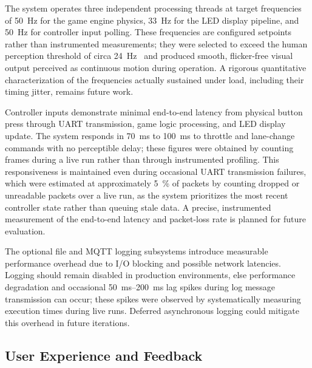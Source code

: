 \documentclass[10pt,journal,final,a4paper]{IEEEtran}
\begin{document}
The system operates three independent processing threads at target frequencies of \SI{50}{\hertz} for the game engine physics, \SI{33}{\hertz} for the LED display pipeline, and \SI{50}{\hertz} for controller input polling. These frequencies are configured setpoints rather than instrumented measurements; they were selected to exceed the human perception threshold of circa \SI{24}{\hertz}~\cite{chen:2007review,pazhoohi:2021effect} and produced smooth, flicker-free visual output perceived as continuous motion during operation. A rigorous quantitative characterization of the frequencies actually sustained under load, including their timing jitter, remains future work.

Controller inputs demonstrate minimal end-to-end latency from physical button press through UART transmission, game logic processing, and LED display update. The system responds in \SI{70}{\milli\second} to \SI{100}{\milli\second} to throttle and lane-change commands with no perceptible delay; these figures were obtained by counting frames during a live run rather than through instrumented profiling. This responsiveness is maintained even during occasional UART transmission failures, which were estimated at approximately \SI{5}{\percent} of packets by counting dropped or unreadable packets over a live run, as the system prioritizes the most recent controller state rather than queuing stale data. A precise, instrumented measurement of the end-to-end latency and packet-loss rate is planned for future evaluation.

The optional file and MQTT logging subsystems introduce measurable performance overhead due to I/O blocking and possible network latencies. Logging should remain disabled in production environments, else performance degradation and occasional \SI{50}{\milli\second}--\SI{200}{\milli\second} lag spikes during log message transmission can occur; these spikes were observed by systematically measuring execution times during live runs. Deferred asynchronous logging could mitigate this overhead in future iterations.

\subsection{User Experience and Feedback}
\label{subsec:user-experience-and-feedback}
\end{document}
